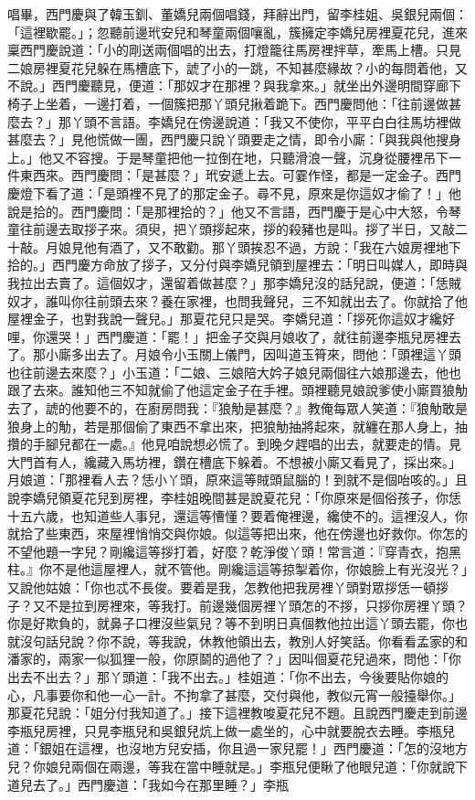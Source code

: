 唱畢，西門慶與了韓玉釧、董嬌兒兩個唱錢，拜辭出門，留李桂姐、吳銀兒兩個：「這裡歇罷。」；忽聽前邊玳安兒和琴童兩個嚷亂，簇擁定李嬌兒房裡夏花兒，進來稟西門慶說道：「小的剛送兩個唱的出去，打燈籠往馬房裡拌草，牽馬上槽。只見二娘房裡夏花兒躲在馬槽底下，諕了小的一跳，不知甚麼緣故？小的每問着他，又不說。」西門慶聽見，便道：「那奴才在那裡？與我拿來。」就坐出外邊明間穿廊下椅子上坐着，一邊打着，一個簇把那丫頭兒揪着跪下。西門慶問他：「往前邊做甚麼去？」那丫頭不言語。李嬌兒在傍邊說道：「我又不使你，平平白白往馬坊裡做甚麼去？」見他慌做一團，西門慶只說丫頭要走之情，即令小廝：「與我與他搜身上。」他又不容搜。于是琴童把他一拉倒在地，只聽滑浪一聲，沉身從腰裡吊下一件東西來。西門慶問：「是甚麼？」玳安遞上去。可霎作怪，都是一定金子。西門慶燈下看了道：「是頭裡不見了的那定金子。尋不見，原來是你這奴才偷了！」他說是拾的。西門慶問：「是那裡拾的？」他又不言語，西門慶于是心中大怒，令琴童往前邊去取拶子來。須臾，把丫頭拶起來，拶的殺豬也是叫。拶了半日，又敲二十敲。月娘見他有酒了，又不敢勸。那丫頭挨忍不過，方說：「我在六娘房裡地下拾的。」西門慶方命放了拶子，又分付與李嬌兒領到屋裡去：「明日叫媒人，即時與我拉出去賣了。這個奴才，還留着做甚麼？」那李嬌兒沒的話兒說，便道：「恁賊奴才，誰叫你往前頭去來？養在家裡，也問我聲兒，三不知就出去了。你就拾了他屋裡金子，也對我說一聲兒。」那夏花兒只是哭。李嬌兒道：「拶死你這奴才纔好哩，你還哭！」西門慶道：「罷！」把金子交與月娘收了，就往前邊李瓶兒房裡去了。那小廝多出去了。月娘令小玉關上儀門，因叫道玉筲來，問他：「頭裡這丫頭也往前邊去來麼？」小玉道：「二娘、三娘陪大妗子娘兒兩個往六娘那邊去，他也跟了去來。誰知他三不知就偷了他這定金子在手裡。頭裡聽見娘說爹使小廝買狼觔去了，諕的他要不的，在廚房問我：『狼觔是甚麼？』教俺每眾人笑道：『狼觔敢是狼身上的觔，若是那個偷了東西不拿出來，把狼觔抽將起來，就纏在那人身上，抽攢的手腳兒都在一處。』他見咱說想必慌了。到晚夕趕唱的出去，就要走的情。見大門首有人，纔藏入馬坊裡，鑽在槽底下躲着。不想被小廝又看見了，採出來。」月娘道：「那裡看人去？恁小丫頭，原來這等賊頭鼠腦的！到就不是個咍咳的。」且說李嬌兒領夏花兒到房裡，李桂姐晚間甚是說夏花兒：「你原來是個俗孩子，你恁十五六歲，也知道些人事兒，還這等慒懂？要着俺裡邊，纔使不的。這裡沒人，你就拾了些東西，來屋裡悄悄交與你娘。似這等把出來，他在傍邊也好救你。你怎的不望他題一字兒？剛纔這等拶打着，好麼？乾淨俊丫頭！常言道：『穿青衣，抱黑柱。』你不是他這屋裡人，就不管他。剛纔這這等掠掣着你，你娘臉上有光沒光？」又說他姑娘：「你也忒不長俊。要着是我，怎教他把我房裡丫頭對眾拶恁一頓拶子？又不是拉到房裡來，等我打。前邊幾個房裡丫頭怎的不拶，只拶你房裡丫頭？你是好欺負的，就鼻子口裡沒些氣兒？等不到明日真個教他拉出這丫頭去罷，你也就沒句話兒說？你不說，等我說，休教他領出去，教別人好笑話。你看看孟家的和潘家的，兩家一似狐狸一般，你原鬬的過他了？」因叫個夏花兒過來，問他：「你出去不出去？」那丫頭道：「我不出去。」桂姐道：「你不出去，今後要貼你娘的心，凡事要你和他一心一計。不拘拿了甚麼，交付與他，教似元宵一般擡舉你。」那夏花兒說：「姐分付我知道了。」接下這裡教唆夏花兒不題。且說西門慶走到前邊李瓶兒房裡，只見李瓶兒和吳銀兒炕上做一處坐的，心中就要脫衣去睡。李瓶兒道：「銀姐在這裡，也沒地方兒安插，你且過一家兒罷！」西門慶道：「怎的沒地方兒？你娘兒兩個在兩邊，等我在當中睡就是。」李瓶兒便瞅了他眼兒道：「你就說下道兒去了。」西門慶道：「我如今在那里睡？」李瓶